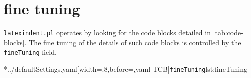 \section{fine tuning}\label{sec:finetuning}
 \texttt{latexindent.pl} operates by looking for the code blocks detailed in \vref{tab:code-blocks}.
 The fine tuning of the details of such code blocks
is controlled by the \texttt{fineTuning} field.

\cmhlistingsfromfile[style=fineTuning]*{../defaultSettings.yaml}[width=.8\linewidth,before=\centering,yaml-TCB]{\texttt{fineTuning}}{lst:fineTuning}
